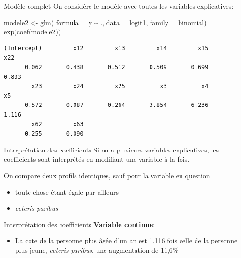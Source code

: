 \documentclass[
  ignorenonframetext,
]{beamer}
\newenvironment{Shaded}{\begin{snugshade}}{\end{snugshade}}
\newcommand{\AttributeTok}[1]{\textcolor[rgb]{0.40,0.45,0.13}{#1}}
\newcommand{\FunctionTok}[1]{\textcolor[rgb]{0.28,0.35,0.67}{#1}}
\newcommand{\NormalTok}[1]{\textcolor[rgb]{0.00,0.23,0.31}{#1}}
\newcommand{\OtherTok}[1]{\textcolor[rgb]{0.00,0.23,0.31}{#1}}
\newcommand{\SpecialCharTok}[1]{\textcolor[rgb]{0.37,0.37,0.37}{#1}}
\providecommand{\tightlist}{%
  \setlength{\itemsep}{0pt}\setlength{\parskip}{0pt}}\usepackage{longtable,booktabs,array}
\begin{document}
\begin{frame}[fragile]{Modèle complet}
\protect\hypertarget{moduxe8le-complet}{}
On considère le modèle avec toutes les variables explicatives:

\begin{Shaded}
\begin{Highlighting}[numbers=left,,]
\NormalTok{modele2 }\OtherTok{\textless{}{-}} \FunctionTok{glm}\NormalTok{(}
  \AttributeTok{formula =}\NormalTok{ y }\SpecialCharTok{\textasciitilde{}}\NormalTok{ .,}
  \AttributeTok{data =}\NormalTok{ logit1,}
  \AttributeTok{family =}\NormalTok{ binomial)}
\FunctionTok{exp}\NormalTok{(}\FunctionTok{coef}\NormalTok{(modele2))}
\end{Highlighting}
\end{Shaded}

\begin{verbatim}
(Intercept)         x12         x13         x14         x15         x22 
      0.062       0.438       0.512       0.509       0.699       0.833 
        x23         x24         x25          x3          x4          x5 
      0.572       0.087       0.264       3.854       6.236       1.116 
        x62         x63 
      0.255       0.090 
\end{verbatim}
\end{frame}

\begin{frame}{Interprétation des coefficients}
\protect\hypertarget{interpruxe9tation-des-coefficients}{}
Si on a plusieurs variables explicatives, les coefficients sont
interprétés en modifiant une variable à la fois.

On compare deux profils identiques, sauf pour la variable en question

\begin{itemize}
\tightlist
\item
  toute chose étant égale par ailleurs
\item
  \emph{ceteris paribus}
\end{itemize}
\end{frame}

\begin{frame}{Interprétation des coefficients}
\protect\hypertarget{interpruxe9tation-des-coefficients-1}{}
\textbf{Variable continue}:

\begin{itemize}
\tightlist
\item
  La cote de la personne plus âgée d'un an est 1.116 fois celle de la
  personne plus jeune, \emph{ceteris paribus}, une augmentation de
  11,6\%
\end{itemize}
\end{frame}
\end{document}
